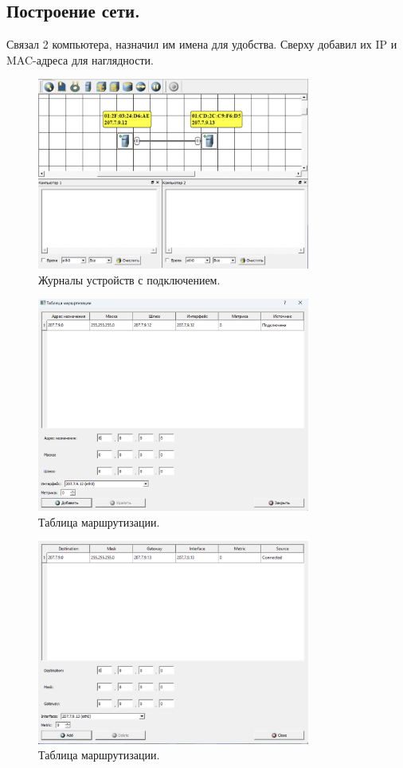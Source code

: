 \documentclass[12pt,onecolumn]{article}
\begin{document}
\subsection{Построение сети.}
Связал 2 компьютера, назначил им имена для удобства. Сверху добавил их IP и MAC-адреса для наглядности.
\begin{figure}[H]
  \centering
  \includegraphics[width=0.8\textwidth]{image/netemul-1-1.png}
  \caption{Журналы устройств с подключением.}
\end{figure}
\begin{figure}[H]
  \centering
  \includegraphics[width=0.8\textwidth]{image/netemul-1-2.png}
  \caption{Таблица маршрутизации.}
\end{figure}
\begin{figure}[H]
  \centering
  \includegraphics[width=0.8\textwidth]{image/routing-table-2.png}
  \caption{Таблица маршрутизации.}
\end{figure}
\end{document}
